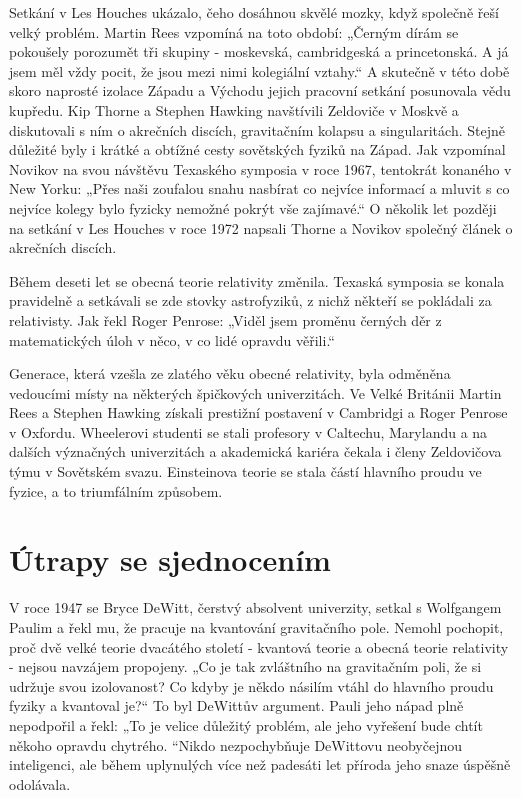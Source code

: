   Setkání v Les Houches ukázalo, čeho dosáhnou skvělé mozky, když společně řeší velký problém.
  Martin Rees vzpomíná na toto období: „Černým dírám se pokoušely porozumět tři skupiny - moskevská,
  cambridgeská a princetonská. A já jsem měl vždy pocit, že jsou mezi nimi kolegiální vztahy.“ A
  skutečně v této době skoro naprosté izolace Západu a Východu jejich pracovní setkání posunovala
  vědu kupředu. Kip Thorne a Stephen Hawking navštívili Zeldoviče v Moskvě a diskutovali s ním o
  akrečních discích, gravitačním kolapsu a singularitách. Stejně důležité byly i krátké a obtížné
  cesty sovětských fyziků na Západ. Jak vzpomínal Novikov na svou návštěvu Texaského symposia v roce
  1967, tentokrát konaného v New Yorku: „Přes naši zoufalou snahu nasbírat co nejvíce informací a
  mluvit s co nejvíce kolegy bylo fyzicky nemožné pokrýt vše zajímavé.“ O několik let později na
  setkání v Les Houches v roce 1972 napsali Thorne a Novikov společný článek o akrečních discích. 

  Během deseti let se obecná teorie relativity změnila. Texaská symposia se konala pravidelně a
  setkávali se zde stovky astrofyziků, z nichž někteří se pokládali za relativisty. Jak řekl Roger
  Penrose: „Viděl jsem proměnu černých děr z matematických úloh v něco, v co lidé opravdu věřili.“

  Generace, která vzešla ze zlatého věku obecné relativity, byla odměněna vedoucími místy na
  některých špičkových univerzitách. Ve Velké Británii Martin Rees a Stephen Hawking získali
  prestižní postavení v Cambridgi a Roger Penrose v Oxfordu. Wheelerovi studenti se stali profesory
  v Caltechu, Marylandu a na dalších význačných univerzitách a akademická kariéra čekala i členy
  Zeldovičova týmu v Sovětském svazu. Einsteinova teorie se stala částí hlavního proudu ve fyzice, a
  to triumfálním způsobem. 

\section{Útrapy se sjednocením}\label{feyIchIIIsecX}
  V roce 1947 se Bryce DeWitt, čerstvý absolvent univerzity, setkal s Wolfgangem Paulim a řekl mu,
  že pracuje na kvantování gravitačního pole. Nemohl pochopit, proč dvě velké teorie dvacátého
  století - kvantová teorie a obecná teorie relativity - nejsou navzájem propojeny. „Co je tak
  zvláštního na gravitačním poli, že si udržuje svou izolovanost? Co kdyby je někdo násilím vtáhl do
  hlavního proudu fyziky a kvantoval je?“ To byl DeWittův argument. Pauli jeho nápad plně nepodpořil
  a řekl: „To je velice důležitý problém, ale jeho vyřešení bude chtít někoho opravdu chytrého.
  “Nikdo nezpochybňuje DeWittovu neobyčejnou inteligenci, ale během uplynulých více než padesáti let
  příroda jeho snaze úspěšně odolávala. 
  
